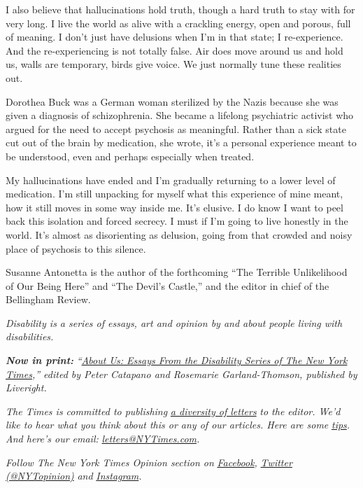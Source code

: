 I also believe that hallucinations hold truth, though a hard truth to
stay with for very long. I live the world as alive with a crackling
energy, open and porous, full of meaning. I don't just have delusions
when I'm in that state; I re-experience. And the re-experiencing is not
totally false. Air does move around us and hold us, walls are temporary,
birds give voice. We just normally tune these realities out.

Dorothea Buck was a German woman sterilized by the Nazis because she was
given a diagnosis of schizophrenia. She became a lifelong psychiatric
activist who argued for the need to accept psychosis as meaningful.
Rather than a sick state cut out of the brain by medication, she wrote,
it's a personal experience meant to be understood, even and perhaps
especially when treated.

My hallucinations have ended and I'm gradually returning to a lower
level of medication. I'm still unpacking for myself what this experience
of mine meant, how it still moves in some way inside me. It's elusive. I
do know I want to peel back this isolation and forced secrecy. I must if
I'm going to live honestly in the world. It's almost as disorienting as
delusion, going from that crowded and noisy place of psychosis to this
silence.

Susanne Antonetta is the author of the forthcoming ``The Terrible
Unlikelihood of Our Being Here'' and ``The Devil's Castle,'' and the
editor in chief of the Bellingham Review.

\emph{Disability is a series of essays, art and opinion by and about
people living with disabilities.}

\emph{\textbf{Now in print:}}
\emph{``}\href{https://www.aboutusbook.com/}{\emph{About Us: Essays From
the Disability Series of The New York Times}}\emph{,'' edited by Peter
Catapano and Rosemarie Garland-Thomson, published by Liveright.}

\emph{The Times is committed to publishing}
\href{https://www.nytimes3xbfgragh.onion/2019/01/31/opinion/letters/letters-to-editor-new-york-times-women.html}{\emph{a
diversity of letters}} \emph{to the editor. We'd like to hear what you
think about this or any of our articles. Here are some}
\href{https://help.nytimes3xbfgragh.onion/hc/en-us/articles/115014925288-How-to-submit-a-letter-to-the-editor}{\emph{tips}}\emph{.
And here's our email:}
\href{mailto:letters@NYTimes.com}{\emph{letters@NYTimes.com}}\emph{.}

\emph{Follow The New York Times Opinion section on}
\href{https://www.facebookcorewwwi.onion/nytopinion}{\emph{Facebook}}\emph{,}
\href{http://twitter.com/NYTOpinion}{\emph{Twitter (@NYTopinion)}}
\emph{and}
\href{https://www.instagram.com/nytopinion/}{\emph{Instagram}}\emph{.}

